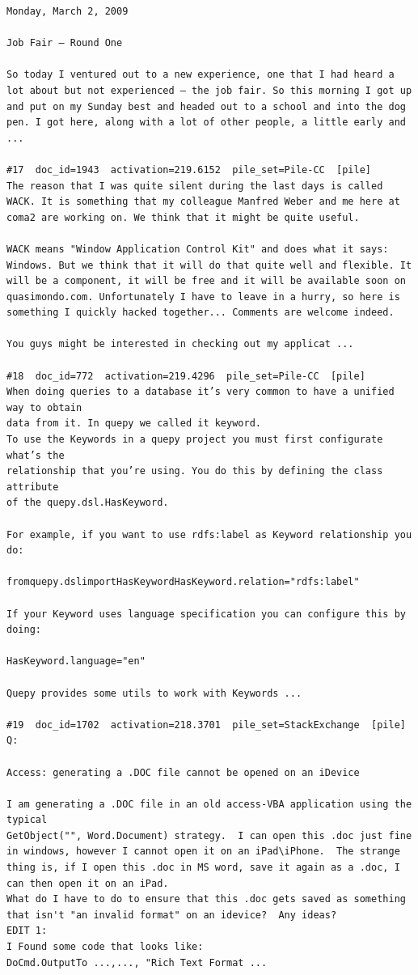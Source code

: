 \begin{verbatim}
Monday, March 2, 2009

Job Fair – Round One

So today I ventured out to a new experience, one that I had heard a lot about but not experienced – the job fair. So this morning I got up and put on my Sunday best and headed out to a school and into the dog pen. I got here, along with a lot of other people, a little early and ...

#17  doc_id=1943  activation=219.6152  pile_set=Pile-CC  [pile]
The reason that I was quite silent during the last days is called WACK. It is something that my colleague Manfred Weber and me here at coma2 are working on. We think that it might be quite useful.

WACK means "Window Application Control Kit" and does what it says: Windows. But we think that it will do that quite well and flexible. It will be a component, it will be free and it will be available soon on quasimondo.com. Unfortunately I have to leave in a hurry, so here is something I quickly hacked together... Comments are welcome indeed.

You guys might be interested in checking out my applicat ...

#18  doc_id=772  activation=219.4296  pile_set=Pile-CC  [pile]
When doing queries to a database it’s very common to have a unified way to obtain
data from it. In quepy we called it keyword.
To use the Keywords in a quepy project you must first configurate what’s the
relationship that you’re using. You do this by defining the class attribute
of the quepy.dsl.HasKeyword.

For example, if you want to use rdfs:label as Keyword relationship you do:

fromquepy.dslimportHasKeywordHasKeyword.relation="rdfs:label"

If your Keyword uses language specification you can configure this by doing:

HasKeyword.language="en"

Quepy provides some utils to work with Keywords ...

#19  doc_id=1702  activation=218.3701  pile_set=StackExchange  [pile]
Q:

Access: generating a .DOC file cannot be opened on an iDevice

I am generating a .DOC file in an old access-VBA application using the typical 
GetObject("", Word.Document) strategy.  I can open this .doc just fine in windows, however I cannot open it on an iPad\iPhone.  The strange thing is, if I open this .doc in MS word, save it again as a .doc, I can then open it on an iPad.
What do I have to do to ensure that this .doc gets saved as something that isn't "an invalid format" on an idevice?  Any ideas?  
EDIT 1: 
I Found some code that looks like:
DoCmd.OutputTo ...,..., "Rich Text Format ...


\end{verbatim}
